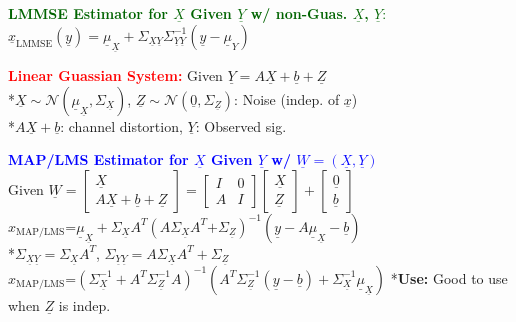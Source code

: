 \documentclass[5pt]{extarticle} %
\begin{document}
\begin{paracol}{3}
{    \textcolor{darkgreen}{\textbf{LMMSE Estimator for $\underline{X}$ Given $\underline{Y}$ w/ non-Guas. $\underline{X}$, $\underline{Y}:$}} \\
    $\hat{\underline{x}}_{\text{LMMSE}}(\underline{y}) = \underline{\mu}_{\underline{X}} + \Sigma_{\underline{X} \underline{Y}} \Sigma_{\underline{Y} \underline{Y}}^{-1} (\underline{y} - \underline{\mu}_Y)$  

    \textcolor{red}{\textbf{Linear Guassian System:}} Given $\underline{Y} = A \underline{X} + \underline{b} + \underline{Z}$ \\
    *$\underline{X} \sim \mathcal{N} (\underline{\mu}_{\underline{X}}, \Sigma_{\underline{X}})$, $\underline{Z} \sim \mathcal{N} (\underline{0}, \Sigma_{\underline{Z}})$: Noise (indep. of $\underline{x}$) \\
    *$A\underline{X} + \underline{b}$: channel distortion, $\underline{Y}$: Observed sig.
    
    \textcolor{blue}{\textbf{MAP/LMS Estimator for $\underline{X}$ Given $\underline{Y}$ w/ $\underline{W}=(\underline{X},\underline{Y})$}} \\
    Given $\underline{W} = \begin{bmatrix}
    \underline{X} \\
    A \underline{X} + \underline{b} + \underline{Z}
    \end{bmatrix} = \begin{bmatrix}
    I & 0 \\
    A & I
    \end{bmatrix} \begin{bmatrix}
    \underline{X} \\
    \underline{Z}
    \end{bmatrix} + \begin{bmatrix}
    \underline{0} \\
    \underline{b}
    \end{bmatrix}$ \\

    $\hat{x}_{\text{MAP/LMS}} \text{=} \underline{\mu}_{\underline{X}} + \Sigma_{\underline{X}} A^T (A \Sigma_{\underline{X}} A^T \text{+} \Sigma_{\underline{Z}})^{-1} (\underline{y} - A \underline{\mu}_{\underline{X}} - \underline{b})$ \\
    *$\Sigma_{\underline{X} \underline{Y}} = \Sigma_{\underline{X}} A^T$, $\Sigma_{\underline{Y} \underline{Y}} = A \Sigma_{\underline{X}} A^T + \Sigma_{\underline{Z}}$ \\
    $\hat{x}_{\text{MAP/LMS}} \text{=} \left(\Sigma_{\underline{X}}^{-1} + A^T \Sigma_{\underline{Z}}^{-1} A \right)^{-1} \left(A^T \Sigma_{\underline{Z}}^{-1} (\underline{y} - \underline{b}) + \Sigma_{\underline{X}}^{-1} \underline{\mu}_{\underline{X}} \right)$ 
    *\textbf{Use:} Good to use when $\underline{Z}$ is indep. 

}
\end{paracol}
\end{document}

